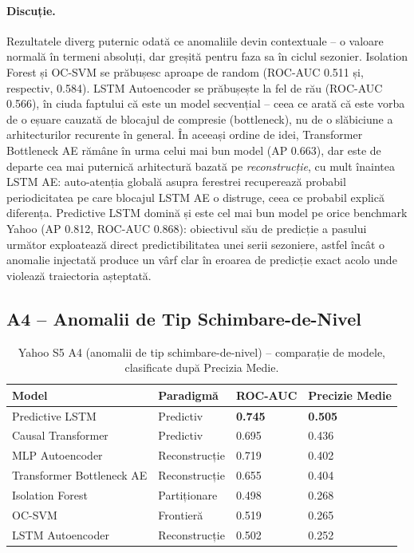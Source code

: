 \paragraph{Discuție.} Rezultatele diverg puternic odată ce anomaliile devin contextuale -- o valoare normală în termeni absoluți, dar greșită pentru faza sa în ciclul sezonier.
Isolation Forest și OC-SVM se prăbușesc aproape de random (ROC-AUC 0.511 și, respectiv, 0.584).
LSTM Autoencoder se prăbușește la fel de rău (ROC-AUC 0.566), în ciuda faptului că este un model secvențial -- ceea ce arată că este vorba de o eșuare cauzată de blocajul de compresie (bottleneck), nu de o slăbiciune a arhitecturilor recurente în general.
În aceeași ordine de idei, Transformer Bottleneck AE rămâne în urma celui mai bun model (AP 0.663), dar este de departe cea mai puternică arhitectură bazată pe \emph{reconstrucție}, cu mult înaintea LSTM AE: auto-atenția globală asupra ferestrei recuperează probabil periodicitatea pe care blocajul LSTM AE o distruge, ceea ce probabil explică diferența.
Predictive LSTM domină și este cel mai bun model pe orice benchmark Yahoo (AP 0.812, ROC-AUC 0.868): obiectivul său de predicție a pasului următor exploatează direct predictibilitatea unei serii sezoniere, astfel încât o anomalie injectată produce un vârf clar în eroarea de predicție exact acolo unde violează traiectoria așteptată.

\subsection{A4 -- Anomalii de Tip Schimbare-de-Nivel}

\begin{table}[h]
\centering
\footnotesize
\begin{tabular}{@{}llll@{}}
\toprule
Model & Paradigmă & ROC-AUC & Precizie Medie \\
\midrule
Predictive LSTM            & Predictiv     & \textbf{0.745} & \textbf{0.505} \\
Causal Transformer         & Predictiv     & 0.695          & 0.436 \\
MLP Autoencoder            & Reconstrucție & 0.719          & 0.402 \\
Transformer Bottleneck AE  & Reconstrucție & 0.655          & 0.404 \\
Isolation Forest           & Partiționare      & 0.498          & 0.268 \\
OC-SVM                     & Frontieră       & 0.519          & 0.265 \\
LSTM Autoencoder           & Reconstrucție & 0.502          & 0.252 \\
\bottomrule
\end{tabular}
\caption{Yahoo S5 A4 (anomalii de tip schimbare-de-nivel) -- comparație de modele, clasificate după Precizia Medie.}
\label{tab:yahoo-a4}
\end{table}

